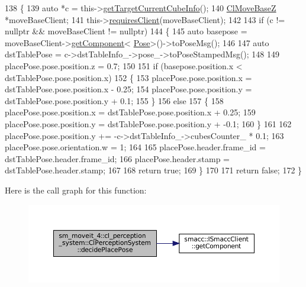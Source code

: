 \begin{DoxyCode}
138             \{
139                 \textcolor{keyword}{auto} *c = this->\hyperlink{classsm__moveit__4_1_1cl__perception__system_1_1ClPerceptionSystem_ac4b944cebb2055a85a33129665df5dcf}{getTargetCurrentCubeInfo}();
140                 \hyperlink{classcl__move__base__z_1_1ClMoveBaseZ}{ClMoveBaseZ} *moveBaseClient;
141                 this->\hyperlink{classsmacc_1_1ISmaccClient_a7a9990a2f3e35d547671188d69fee520}{requiresClient}(moveBaseClient);
142 
143                 \textcolor{keywordflow}{if} (c != \textcolor{keyword}{nullptr} && moveBaseClient != \textcolor{keyword}{nullptr})
144                 \{
145                     \textcolor{keyword}{auto} basepose = moveBaseClient->\hyperlink{classsmacc_1_1ISmaccClient_adef78db601749ca63c19e74a27cb88cc}{getComponent}<
      \hyperlink{classcl__move__base__z_1_1Pose}{Pose}>()->toPoseMsg();
146 
147                     \textcolor{keyword}{auto} dstTablePose = c->dstTableInfo\_->pose\_->toPoseStampedMsg();
148 
149                     placePose.pose.position.z = 0.7;
150 
151                     \textcolor{keywordflow}{if} (basepose.position.x < dstTablePose.pose.position.x)
152                     \{
153                         placePose.pose.position.x = dstTablePose.pose.position.x - 0.25;
154                         placePose.pose.position.y = dstTablePose.pose.position.y + 0.1;
155                     \}
156                     \textcolor{keywordflow}{else}
157                     \{
158                         placePose.pose.position.x = dstTablePose.pose.position.x + 0.25;
159                         placePose.pose.position.y = dstTablePose.pose.position.y + -0.1;
160                     \}
161 
162                     placePose.pose.position.y += -c->dstTableInfo\_->cubesCounter\_ * 0.1;
163                     placePose.pose.orientation.w = 1;
164 
165                     placePose.header.frame\_id = dstTablePose.header.frame\_id;
166                     placePose.header.stamp = dstTablePose.header.stamp;
167 
168                     \textcolor{keywordflow}{return} \textcolor{keyword}{true};
169                 \}
170 
171                 \textcolor{keywordflow}{return} \textcolor{keyword}{false};
172             \}
\end{DoxyCode}
Here is the call graph for this function\+:
\nopagebreak
\begin{figure}[H]
\begin{center}
\leavevmode
\includegraphics[width=350pt]{classsm__moveit__4_1_1cl__perception__system_1_1ClPerceptionSystem_af6ff9a225d451bdee312573296ed02a8_cgraph}
\end{center}
\end{figure}

